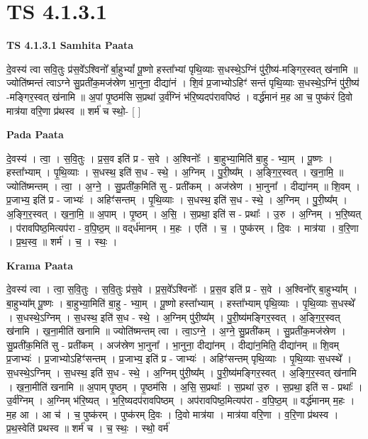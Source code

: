 \documentclass[17pt]{extarticle}
\begin{document}
\section{ TS 4.1.3.1 }

\textbf{TS 4.1.3.1 } \newline
\textbf{Samhita Paata} \newline

दे॒वस्य॑ त्वा सवि॒तुः प्र॑स॒वे᳚ऽश्विनो᳚ र्बा॒हुभ्यां᳚ पू॒ष्णो हस्ता᳚भ्यां पृथि॒व्याः स॒धस्थे॒ऽग्निं पु॑री॒ष्य॑-मङ्गिर॒स्वत् ख॑नामि ॥ ज्योति॑ष्मन्तं त्वाऽग्ने सु॒प्रती॑क॒मज॑स्रेण भा॒नुना॒ दीद्या॑नं । शि॒वं प्र॒जाभ्योऽहिꣳ॑ सन्तं पृथि॒व्याः स॒धस्थे॒ऽग्निं पु॑री॒ष्य॑ -मङ्गिर॒स्वत् ख॑नामि ॥ अ॒पां पृ॒ष्ठम॑सि स॒प्रथा॑ उ॒र्व॑ग्निं भ॑रि॒ष्यदप॑रावपिष्ठं । वर्द्ध॑मानं म॒ह आ च॒ पुष्क॑रं दि॒वो मात्र॑या वरि॒णा प्र॑थस्व ॥ शर्म॑ च स्थो॒- [  ] \newline

\textbf{Pada Paata} \newline

दे॒वस्य॑ । त्वा॒ । स॒वि॒तुः । प्र॒स॒व इति॑ प्र - स॒वे । अ॒श्विनोः᳚ । बा॒हुभ्या॒मिति॑ बा॒हु - भ्या॒म् । पू॒ष्णः । हस्ता᳚भ्याम् । पृ॒थि॒व्याः । स॒धस्थ॒ इति॑ स॒ध - स्थे॒ । अ॒ग्निम् । पु॒री॒ष्य᳚म् । अ॒ङ्गि॒र॒स्वत् । ख॒ना॒मि॒ ॥ ज्योति॑ष्मन्तम् । त्वा॒ । अ॒ग्ने॒ । सु॒प्रती॑क॒मिति॑ सु - प्रती॑कम् । अज॑स्रेण । भा॒नुना᳚ । दीद्या॑नम् ॥ शि॒वम् । प्र॒जाभ्य॒ इति॑ प्र - जाभ्यः॑ । अहिꣳ॑सन्तम् । पृ॒थि॒व्याः । स॒धस्थ॒ इति॑ स॒ध - स्थे॒ । अ॒ग्निम् । पु॒री॒ष्य᳚म् । अ॒ङ्गि॒र॒स्वत् । ख॒ना॒मि॒ ॥ अ॒पाम् । पृ॒ष्ठम् । अ॒सि॒ । स॒प्रथा॒ इति॑ स - प्रथाः᳚ । उ॒रु । अ॒ग्निम् । भ॒रि॒ष्यत् । प॑रावपिष्ठ॒मित्यप॑रा - व॒पि॒ष्ठ॒म् ॥ वद्‌र्ध॑मानम् । म॒हः । एति॑ । च॒ । पुष्क॑रम् । दि॒वः । मात्र॑या । व॒रि॒णा । प्र॒थ॒स्व॒ ॥ शर्म॑ । च॒ । स्थः॒ ।  \newline


\textbf{Krama Paata} \newline

दे॒वस्य॑ त्वा । त्वा॒ स॒वि॒तुः । स॒वि॒तुः प्र॑स॒वे । प्र॒स॒वे᳚ऽश्विनोः᳚ । प्र॒स॒व इति॑ प्र - स॒वे । अ॒श्विनो᳚र् बा॒हुभ्या᳚म् । बा॒हुभ्या᳚म् पू॒ष्णः । बा॒हुभ्या॒मिति॑ बा॒हु - भ्या॒म् । पू॒ष्णो हस्ता᳚भ्याम् । हस्ता᳚भ्याम् पृथि॒व्याः । पृ॒थि॒व्याः स॒धस्थे᳚ । स॒धस्थे॒ऽग्निम् । स॒धस्थ॒ इति॑ स॒ध - स्थे॒ । अ॒ग्निम् पु॑री॒ष्य᳚म् । पु॒री॒ष्य॑मङ्गिर॒स्वत् । अ॒ङ्गि॒र॒स्वत् ख॑नामि । ख॒ना॒मीति॑ खनामि ॥ ज्योति॑ष्मन्तम् त्वा । त्वा॒ऽग्ने॒ । अ॒ग्ने॒ सु॒प्रती॑कम् । सु॒प्रती॑क॒मज॑स्रेण । सु॒प्रती॑क॒मिति॑ सु - प्रती॑कम् । अज॑स्रेण भा॒नुना᳚ । भा॒नुना॒ दीद्या॑नम् । दीद्या॑न॒मिति॒ दीद्या॑नम् ॥ शि॒वम् प्र॒जाभ्यः॑ । प्र॒जाभ्योऽहिꣳ॑सन्तम् । प्र॒जाभ्य॒ इति॑ प्र - जाभ्यः॑ । अहिꣳ॑सन्तम् पृथि॒व्याः । पृ॒थि॒व्याः स॒धस्थे᳚ । स॒धस्थे॒ऽग्निम् । स॒धस्थ॒ इति॑ स॒ध - स्थे॒ । अ॒ग्निम् पु॑री॒ष्य᳚म् । पु॒री॒ष्य॑मङ्गिर॒स्वत् । अ॒ङ्गि॒र॒स्वत् ख॑नामि । ख॒ना॒मीति॑ खनामि ॥ अ॒पाम् पृ॒ष्ठम् । पृ॒ष्ठम॑सि । अ॒सि॒ स॒प्रथाः᳚ । स॒प्रथा॑ उ॒रु । स॒प्रथा॒ इति॑ स - प्रथाः᳚ । उ॒र्व॑ग्निम् । अ॒ग्निम् भ॑रि॒ष्यत् । भ॒रि॒ष्यदप॑रावपिष्ठम् । अप॑रावपिष्ठ॒मित्यप॑रा - व॒पि॒ष्ठ॒म् ॥ वर्द्ध॑मानम् म॒हः । म॒ह आ । आ च॑ । च॒ पुष्क॑रम् । पुष्क॑रम् दि॒वः । दि॒वो मात्र॑या । मात्र॑या वरि॒णा । व॒रि॒णा प्र॑थस्व । प्र॒थ॒स्वेति॑ प्रथस्व ॥ शर्म॑ च । च॒ स्थः॒ । स्थो॒ वर्म॑ \newline
\end{document}

